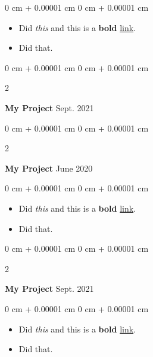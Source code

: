 \documentclass[10pt, letterpaper]{article}
\newenvironment{highlights}{
    \begin{itemize}[
        topsep=0.10 cm,
        parsep=0.10 cm,
        partopsep=0pt,
        itemsep=0pt,
        leftmargin=0 cm + 10pt
    ]
}{
    \end{itemize}
} %
\newenvironment{onecolentry}{
    \begin{adjustwidth}{
        0 cm + 0.00001 cm
    }{
        0 cm + 0.00001 cm
    }
}{
    \end{adjustwidth}
} %
\newenvironment{twocolentry}[2][]{
    \onecolentry
    \def\secondColumn{#2}
    \setcolumnwidth{\fill, 4.5 cm}
    \begin{paracol}{2}
}{
    \switchcolumn \raggedleft \secondColumn
    \end{paracol}
    \endonecolentry
} %
\begin{document}
        \vspace{0.10 cm}
        \begin{onecolentry}
            \begin{highlights}
                \item Did \textit{this} and this is a \textbf{bold} \href{https://example.com}{link}.
                \item Did that.
            \end{highlights}
        \end{onecolentry}


        \vspace{0.2 cm}

        \begin{twocolentry}{
            Sept. 2021
        }
            \textbf{My Project}\end{twocolentry}



        \vspace{0.2 cm}

        \begin{twocolentry}{
            June 2020
        }
            \textbf{My Project}\end{twocolentry}

        \vspace{0.10 cm}
        \begin{onecolentry}
            \begin{highlights}
                \item Did \textit{this} and this is a \textbf{bold} \href{https://example.com}{link}.
                \item Did that.
            \end{highlights}
        \end{onecolentry}


        \vspace{0.2 cm}

        \begin{twocolentry}{
            Sept. 2021
        }
            \textbf{My Project}\end{twocolentry}

        \vspace{0.10 cm}
        \begin{onecolentry}
            \begin{highlights}
                \item Did \textit{this} and this is a \textbf{bold} \href{https://example.com}{link}.
                \item Did that.
            \end{highlights}
        \end{onecolentry}
\end{document}
